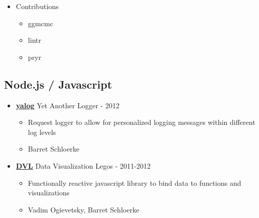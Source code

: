 \documentclass[oneside]{article}
\begin{document}
\begin{itemize}
      \item{Contributions}
        \begin{itemize}
          \item ggmcmc
          \item lintr
          \item pryr
        \end{itemize}

    \end{itemize}

  \subsection{Node.js / Javascript}

    \begin{itemize}
      \item {\bf \href{http://github.com/schloerke/yalog}{yalog}} Yet Another Logger - 2012
        \begin{itemize}
          \item Request logger to allow for personalized logging messages within different log levels
          \item Barret Schloerke
        \end{itemize}
    \end{itemize}

    \begin{itemize}
      \item {\bf \href{http://github.com/vogievetsky/DVL}{DVL}} Data Visualization Legos - 2011-2012
        \begin{itemize}
          \item Functionally reactive javascript library to bind data to functions and visualizations
          \item Vadim Ogievetsky, Barret Schloerke
        \end{itemize}
    \end{itemize}
\end{document}
